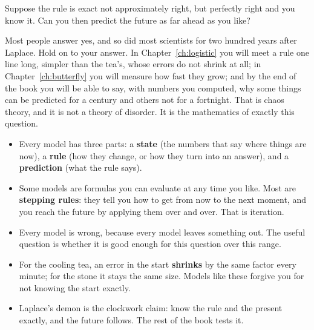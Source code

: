 
\begin{think}
Suppose the rule is exact \dash{} not approximately right, but perfectly
right \dash{} and you know it. Can you then predict the future as far ahead as
you like?
\end{think}

\noindent
Most people answer yes, and so did most scientists for two hundred years
after Laplace. Hold on to your answer. In Chapter~\ref{ch:logistic} you will
meet a rule one line long, simpler than the tea's, whose errors do not shrink
at all; in Chapter~\ref{ch:butterfly} you will measure how fast they grow; and
by the end of the book you will be able to say, with numbers you computed,
why some things can be predicted for a century and others not for a
fortnight. That is chaos theory, and it is not a theory of disorder. It is
the mathematics of exactly this question.

\begin{summarybox}
\begin{itemize}
\item Every model has three parts: a \textbf{state} (the numbers that say
  where things are now), a \textbf{rule} (how they change, or how they turn
  into an answer), and a \textbf{prediction} (what the rule says).
\item Some models are formulas you can evaluate at any time you like. Most
  are \textbf{stepping rules}: they tell you how to get from now to the next
  moment, and you reach the future by applying them over and over. That is
  iteration.
\item Every model is wrong, because every model leaves something out. The
  useful question is whether it is good enough for this question over this
  range.
\item For the cooling tea, an error in the start \textbf{shrinks} by the same
  factor every minute; for the stone it stays the same size. Models like these
  forgive you for not knowing the start exactly.
\item Laplace's demon is the clockwork claim: know the rule and the present
  exactly, and the future follows. The rest of the book tests it.
\end{itemize}
\end{summarybox}

